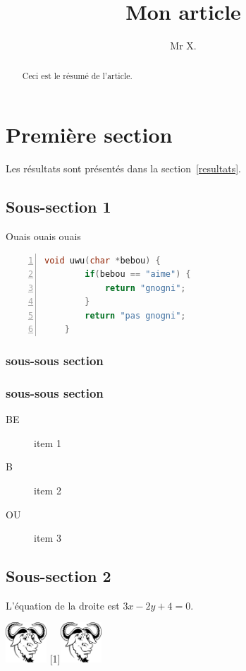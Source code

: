 \documentclass{article}
\title{Mon article}
\author{Mr X.}
\begin{document}
\maketitle

\begin{abstract}
    Ceci est le résumé de l'article.
\end{abstract}

\tableofcontents

\section{Première section}

Les résultats sont présentés dans la section~\ref{resultats}.

\subsection{Sous-section 1}

Ouais ouais ouais \cite{diday-1982}

\begin{lstlisting}[language=C, numbers=left, frame=single]
    void uwu(char *bebou) {
        if(bebou == "aime") {
            return "gnogni";
        }
        return "pas gnogni";
    }
\end{lstlisting}

\subsubsection{sous-sous section}

\subsubsection{sous-sous section}

\begin{description}
    \item[BE] item 1
    \item[B] item 2
    \item[OU] item 3
\end{description}


\subsection{Sous-section 2}

L’équation de la droite est $3x - 2y + 4 = 0$.

\includegraphics[height=1.5cm]{gnu.png}
\scalebox{-1}[1]{\includegraphics[height=1.5cm]{gnu.png}}
\end{document}
